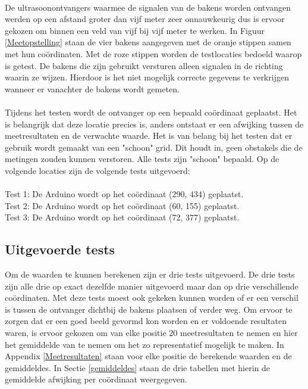 \documentclass{article}
\begin{document}
\\
De ultrasoonontvangers waarmee de signalen van de bakens worden ontvangen werden op een afstand groter dan vijf meter zeer onnauwkeurig dus is ervoor gekozen om binnen een veld van vijf bij vijf meter te werken. In Figuur \ref{Meetopstelling} staan de vier bakens aangegeven met de oranje stippen samen met hun co\"{o}rdinaten. Met de roze stippen worden de testlocaties bedoeld waarop is getest. De bakens die zijn gebruikt versturen alleen signalen in de richting waarin ze wijzen. Hierdoor is het niet mogelijk correcte gegevens te verkrijgen wanneer er vanachter de bakens wordt gemeten. \\
\\
Tijdens het testen wordt de ontvanger op een bepaald co\"{o}rdinaat geplaatst. Het is belangrijk dat deze locatie precies is, anders ontstaat er een afwijking tussen de meetresultaten en de verwachte waarde. 
Het is van belang bij het testen dat er gebruik wordt gemaakt van een "schoon" grid. Dit houdt in, geen obstakels die de metingen zouden kunnen verstoren. Alle tests zijn "schoon"  bepaald. 
Op de volgende locaties zijn de volgende tests uitgevoerd:\\
\\
\indent Test 1: De Arduino wordt op het co\"{o}rdinaat (290, 434) geplaatst. \\
\indent Test 2: De Arduino wordt op het co\"{o}rdinaat (60, 155) geplaatst. \\
\indent Test 3: De Arduino wordt op het co\"{o}rdinaat (72, 377) geplaatst. 

\subsection{Uitgevoerde tests}
Om de waarden te kunnen berekenen zijn er drie tests uitgevoerd. De drie tests zijn alle drie op exact dezelfde manier uitgevoerd maar dan op drie verschillende co\"{o}rdinaten. Met deze tests moest ook gekeken kunnen worden of er een verschil is tussen de ontvanger dichtbij de bakens plaatsen of verder weg. Om ervoor te zorgen dat er een goed beeld gevormd kon worden en er voldoende resultaten waren, is ervoor gekozen om van elke positie 20 meetresultaten te nemen en hier het gemiddelde van te nemen om het zo representatief mogelijk te maken. In Appendix \ref{Meetresultaten} staan voor elke positie de berekende waarden en de gemiddeldes. In Sectie \ref{gemiddeldes} staan de drie tabellen met hierin de gemiddelde afwijking per co\"{o}rdinaat weergegeven.
\end{document}
